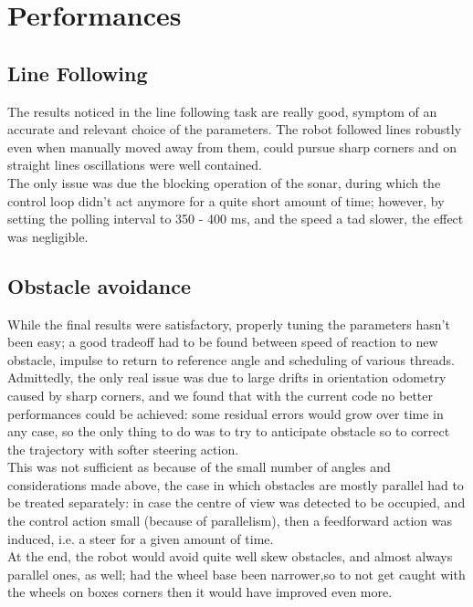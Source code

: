 \documentclass[a4paper,11pt,oneside]{book}
\begin{document}
				
			
			\section{Performances}
			\subsection{Line Following}
			The results noticed in the line following task are really good, symptom of an accurate and relevant choice of the parameters. The robot followed lines robustly even when manually moved away from them, could pursue sharp corners and on straight lines oscillations were well contained.\\
			The only issue was due the blocking operation of the sonar, during which the control loop didn't act anymore for a quite short amount of time; however, by setting the polling interval to 350 - 400 ms, and the speed a tad slower, the effect was negligible.
			
			\subsection{Obstacle avoidance}
			While the final results were satisfactory, properly tuning the parameters hasn't been easy; a good tradeoff had to be found between speed of reaction to new obstacle, impulse to return to reference angle and scheduling of various threads.\\
			Admittedly, the only real issue was due to large drifts in orientation odometry caused by sharp corners, and we found that with the current code no better performances could be achieved: some residual errors would grow over time in any case, so the only thing to do was to try to anticipate obstacle so to correct the trajectory with softer steering action.\\
			
			This was not sufficient as because of the small number of angles and considerations made above, the case in which obstacles are mostly parallel had to be treated separately: in case the centre of view was detected to be occupied, and the control action small (because of parallelism), then a feedforward action was induced, i.e. a steer for a given amount of time.\\
			
			At the end, the robot would avoid quite well skew obstacles, and almost always parallel ones, as well; had the wheel base been narrower,so to not get caught with the wheels on boxes corners then it would have improved even more.
			
\end{document}
